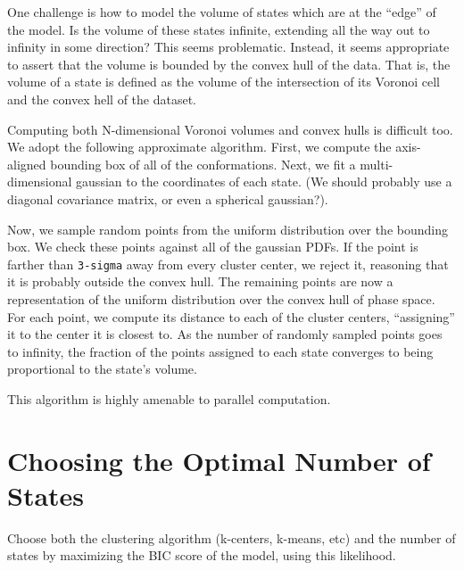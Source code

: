 \documentclass[twocolumn,floatfix,nofootinbib,aps]{revtex4-1}
\begin{document}
One challenge is how to model the volume of states which are at the
``edge'' of the model. Is the volume of these states infinite, extending
all the way out to infinity in some direction? This seems problematic.
Instead, it seems appropriate to assert that the volume is bounded by
the convex hull of the data. That is, the volume of a state is defined
as the volume of the intersection of its Voronoi cell and the convex
hell of the dataset.

Computing both N-dimensional Voronoi volumes and convex hulls is
difficult too. We adopt the following approximate algorithm. First, we
compute the axis-aligned bounding box of all of the conformations. Next,
we fit a multi-dimensional gaussian to the coordinates of each state.
(We should probably use a diagonal covariance matrix, or even a
spherical gaussian?).

Now, we sample random points from the uniform distribution over the
bounding box. We check these points against all of the gaussian PDFs. If
the point is farther than \texttt{3-sigma} away from every cluster
center, we reject it, reasoning that it is probably outside the convex
hull. The remaining points are now a representation of the uniform
distribution over the convex hull of phase space. For each point, we
compute its distance to each of the cluster centers, ``assigning'' it to
the center it is closest to. As the number of randomly sampled points
goes to infinity, the fraction of the points assigned to each state
converges to being proportional to the state's volume.

This algorithm is highly amenable to parallel computation.

\section{Choosing the Optimal Number of States}

Choose both the clustering algorithm (k-centers, k-means, etc) and the
number of states by maximizing the BIC score of the model, using this
likelihood.


\end{document}
